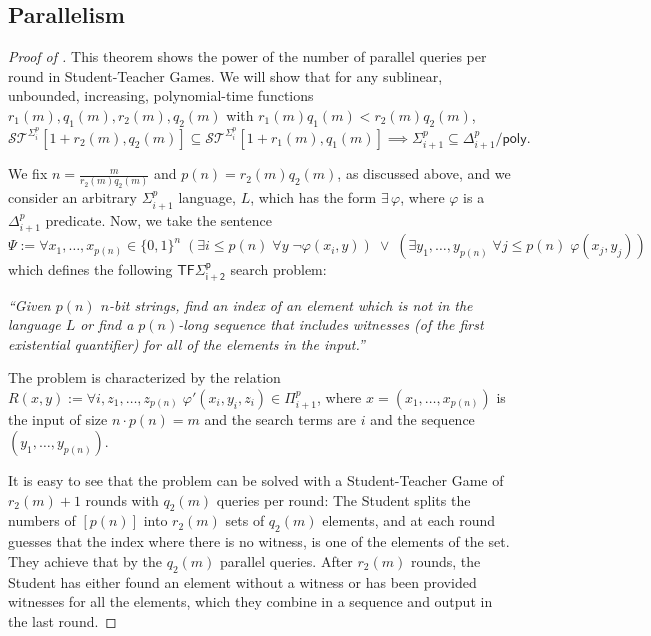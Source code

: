 \documentclass[11pt]{article}
\newcommand{\poly}{\mathsf{poly}}
\theoremstyle{definition}
\theoremstyle{definition}
\theoremstyle{remark}
\begin{document}
\subsection{Parallelism}\label{sec:st2}
     \begin{proof}[Proof of ]
     This theorem shows the power of the number of parallel queries per round in Student-Teacher Games. We will show that for any sublinear, unbounded, increasing, polynomial-time functions $r_1(m),q_1(m),r_2(m),q_2(m)$ with $r_1(m)q_1(m)<r_2(m)q_2(m)$,
        $$
        \mathcal{ST}^{\Sigma^p_i}[1+r_2(m),q_2(m)]\subseteq \mathcal{ST}^{\Sigma^p_i}[1+r_1(m),q_1(m)] \implies \Sigma^p_{i+1}\subseteq \Delta^p_{i+1}/\poly.
        $$
        
        We fix $n=\frac{m}{r_2(m)q_2(m)}$ and $p(n)=r_2(m)q_2(m)$, as discussed above, and we consider an arbitrary $\Sigma^p_{i+1}$ language, $L$, which has the form $\exists \,\varphi $, where $\varphi$ is a $\Delta^p_{i+1}$ predicate. Now, we take the sentence
    \begin{equation}
        \Psi:=\forall x_1,\dots,x_{p(n)}\in \{0,1\}^n\; \left( \exists i\leq p(n) \; \forall y \;\neg \varphi(x_i,y)\right)\; \lor \; \left( \exists y_1,\dots,y_{p(n)} \; \forall j\leq p(n)\; \varphi(x_j,y_j) \right)
        \nonumber
    \end{equation}
    which defines the following $\mathsf{TF\Sigma^p_{i+2}}$ search problem:

    \emph{``Given $p(n)$ $n$-bit strings, find an index of an element which is not in the language $L$ or find a $p(n)$-long sequence that includes witnesses (of the first existential quantifier) for all of the elements in the input.''}
   
    The problem is characterized by the relation $R(x,y):=\forall i,z_1,\dots,z_{p(n)}\; \varphi'(x_i,y_i,z_i)\in \Pi^p_{i+1}$, where $x=(x_1,\dots,x_{p(n)})$ is the input of size $n\cdot p(n)=m$ and the search terms are $i$ and the sequence $(y_1,\dots,y_{p(n)})$.
    
    It is easy to see that the problem can be solved with a Student-Teacher Game of $r_2(m)+1$ rounds with $q_2(m)$ queries per round: The Student splits the numbers of $[p(n)]$ into $r_2(m)$ sets of $q_2(m)$ elements, and at each round guesses that the index where there is no witness, is one of the elements of the set. They achieve that by the $q_2(m)$ parallel queries. After $r_2(m)$ rounds, the Student has either found an element without a witness or has been provided witnesses for all the elements, which they combine in a sequence and output in the last round.


\end{proof}
\end{document}
